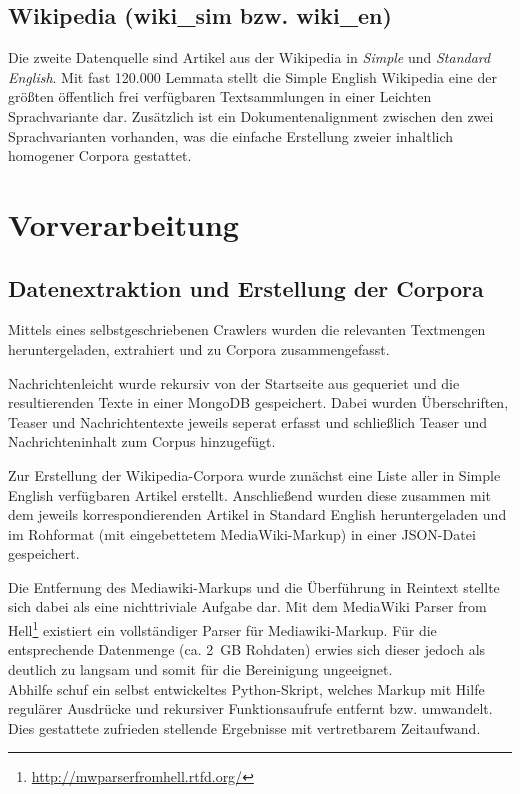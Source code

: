\documentclass[11pt, a4paper]{article}
\begin{document}
\subsection{Wikipedia (wiki\_sim bzw. wiki\_en)}
\label{corp-wiki}
Die zweite Datenquelle sind Artikel aus der Wikipedia in \emph{Simple} und
\emph{Standard English}. Mit fast 120.000 Lemmata stellt die Simple English
Wikipedia eine der gr\"o\ss{}ten \"offentlich frei verf\"ugbaren Textsammlungen
in einer Leichten Sprachvariante dar.
Zus\"atzlich ist ein Dokumentenalignment zwischen den zwei Sprachvarianten
vorhanden, was die einfache Erstellung zweier inhaltlich homogener Corpora
gestattet.


\section{Vorverarbeitung}
\label{sec:vorverarb}

\subsection{Datenextraktion und Erstellung der Corpora}
\label{datextr}

Mittels eines selbstgeschriebenen Crawlers wurden die relevanten Textmengen
heruntergeladen, extrahiert und zu Corpora zusammengefasst.

Nachrichtenleicht wurde rekursiv von der Startseite aus gequeriet
und die resultierenden Texte in einer MongoDB gespeichert.
Dabei wurden Überschriften, Teaser und Nachrichtentexte jeweils seperat erfasst
und schließlich Teaser und Nachrichteninhalt zum Corpus hinzugefügt.

Zur Erstellung der Wikipedia-Corpora wurde zunächst eine Liste aller
in Simple English verfügbaren Artikel erstellt. Anschließend wurden diese
zusammen mit dem jeweils korrespondierenden Artikel in Standard English
heruntergeladen und im Rohformat (mit eingebettetem MediaWiki-Markup) in einer
JSON-Datei gespeichert.

Die Entfernung des Mediawiki-Markups und die Überführung in Reintext stellte
sich dabei als eine nichttriviale Aufgabe dar.
Mit dem MediaWiki Parser from
Hell\footnote{\url{http://mwparserfromhell.rtfd.org/}} existiert ein
vollständiger Parser für Mediawiki-Markup.
Für die entsprechende Datenmenge (ca. 2~GB Rohdaten) erwies sich dieser jedoch
als deutlich zu langsam und somit für die Bereinigung ungeeignet.
\\
Abhilfe schuf ein selbst entwickeltes Python-Skript, welches Markup mit Hilfe
regul\"arer Ausdr\"ucke und rekursiver Funktionsaufrufe entfernt bzw. umwandelt.
Dies gestattete zufrieden stellende Ergebnisse mit vertretbarem Zeitaufwand.
\end{document}

